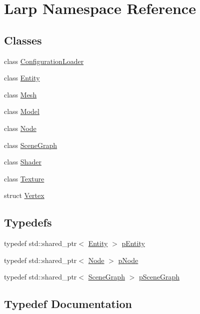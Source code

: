 \hypertarget{namespaceLarp}{}\section{Larp Namespace Reference}
\label{namespaceLarp}
\subsection*{Classes}
\begin{DoxyCompactItemize}
\item 
class \hyperlink{classLarp_1_1ConfigurationLoader}{Configuration\+Loader}
\item 
class \hyperlink{classLarp_1_1Entity}{Entity}
\item 
class \hyperlink{classLarp_1_1Mesh}{Mesh}
\item 
class \hyperlink{classLarp_1_1Model}{Model}
\item 
class \hyperlink{classLarp_1_1Node}{Node}
\item 
class \hyperlink{classLarp_1_1SceneGraph}{Scene\+Graph}
\item 
class \hyperlink{classLarp_1_1Shader}{Shader}
\item 
class \hyperlink{classLarp_1_1Texture}{Texture}
\item 
struct \hyperlink{structLarp_1_1Vertex}{Vertex}
\end{DoxyCompactItemize}
\subsection*{Typedefs}
\begin{DoxyCompactItemize}
\item 
typedef std\+::shared\+\_\+ptr$<$ \hyperlink{classLarp_1_1Entity}{Entity} $>$ \hyperlink{namespaceLarp_aca47662468377e5aaf9a665699a4d97f}{p\+Entity}
\item 
typedef std\+::shared\+\_\+ptr$<$ \hyperlink{classLarp_1_1Node}{Node} $>$ \hyperlink{namespaceLarp_a57e9a3e29e68cdf508c964274d9ac1a4}{p\+Node}
\item 
typedef std\+::shared\+\_\+ptr$<$ \hyperlink{classLarp_1_1SceneGraph}{Scene\+Graph} $>$ \hyperlink{namespaceLarp_a590f73362521ab6a9c682d4eb2719002}{p\+Scene\+Graph}
\end{DoxyCompactItemize}


\subsection{Typedef Documentation}
